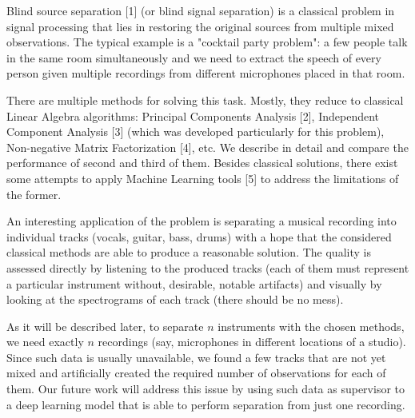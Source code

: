 \documentclass[../main.tex]{subfiles} %
\begin{document}

Blind source separation [1] (or blind signal separation) is a classical problem in signal processing that lies in restoring the original sources from multiple mixed observations. The typical example is a "cocktail party problem": a few people talk in the same room simultaneously and we need to extract the speech of every person given multiple recordings from different microphones placed in that room.

There are multiple methods for solving this task. Mostly, they reduce to classical Linear Algebra algorithms: Principal Components Analysis [2], Independent Component Analysis [3] (which was developed particularly for this problem), Non-negative Matrix Factorization [4], etc. We describe in detail and compare the performance of second and third of them. Besides classical solutions, there exist some attempts to apply Machine Learning tools [5] to address the limitations of the former.


An interesting application of the problem is separating a musical recording into individual tracks (vocals, guitar, bass, drums) with a hope that the considered classical methods are able to produce a reasonable solution. 
The quality is assessed directly by listening to the produced tracks (each of them must represent a particular instrument without, desirable, notable artifacts) and visually by looking at the spectrograms of each track (there should be no mess).


As it will be described later, to separate $n$ instruments with the chosen methods, we need exactly $n$ recordings (say, microphones in different locations of a studio). Since such data is usually unavailable, we found a few tracks that are not yet mixed and artificially created the required number of observations for each of them. Our future work will address this issue by using such data as supervisor to a deep learning model that is able to perform separation from just one recording.
 
\end{document}
